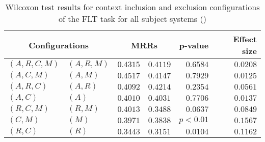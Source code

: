 
\begin{table}
\begin{spacing}{1.2}
\centering
\caption{Wilcoxon test results for context inclusion and exclusion configurations of the FLT task for all subject systems (\ctwo)}
\label{table:versus-wilcox-all-flt-context}
\begin{tabular}{ll|rr|rr}
\toprule
      \multicolumn{2}{c|}{Configurations} &                \multicolumn{2}{c|}{MRRs} &             p-value & Effect size \\
\midrule
 $(A,R,C,M)$ &  $(A,R,M)$ &  $\bm{0.4315}$ &       $0.4119$ & $0.6584$ &    $0.0208$ \\
   $(A,C,M)$ &    $(A,M)$ &  $\bm{0.4517}$ &       $0.4147$ & $0.7929$ &    $0.0125$ \\
   $(A,R,C)$ &    $(A,R)$ &       $0.4092$ &  $\bm{0.4214}$ & $0.2354$ &    $0.0561$ \\
     $(A,C)$ &      $(A)$ &       $0.4010$ &  $\bm{0.4031}$ & $0.7706$ &    $0.0137$ \\
   $(R,C,M)$ &    $(R,M)$ &  $\bm{0.4013}$ &       $0.3488$ & $0.0637$ &    $0.0849$ \\
     $(C,M)$ &      $(M)$ &  $\bm{0.3971}$ &       $0.3838$ & $p<0.01$ &    $0.1567$ \\
     $(R,C)$ &      $(R)$ &  $\bm{0.3443}$ &       $0.3151$ & $0.0104$ &    $0.1162$ \\
\bottomrule
\end{tabular}

\end{spacing}
\end{table}

